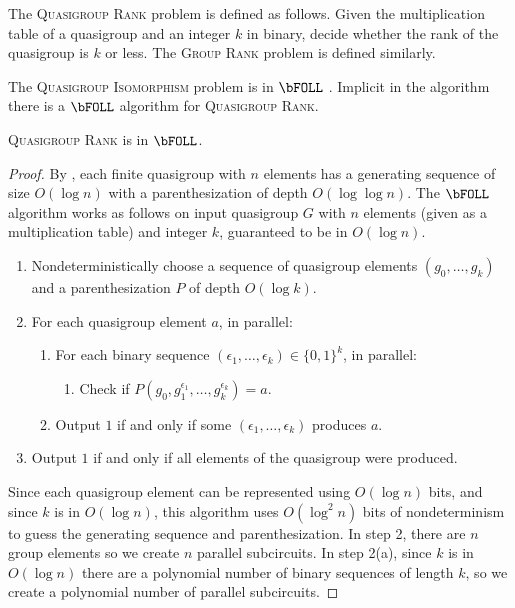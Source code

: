 \documentclass{article}
\begin{document}
The \textsc{Quasigroup Rank} problem is defined as follows.
Given the multiplication table of a quasigroup and an integer $k$ in binary, decide whether the rank of the quasigroup is $k$ or less.
The \textsc{Group Rank} problem is defined similarly.

The \textsc{Quasigroup Isomorphism} problem is in $\bFOLL$ \autocite[Theorem~3.4]{ctw13}.
Implicit in the algorithm there is a $\bFOLL$ algorithm for \textsc{Quasigroup Rank}.

\begin{theorem}
  \textsc{Quasigroup Rank} is in $\bFOLL$.
\end{theorem}
\begin{proof}
  By \autocite[Theorem~3.3]{ctw13}, each finite quasigroup with $n$ elements has a generating sequence of size $O(\log n)$ with a parenthesization of depth $O(\log \log n)$.
  The $\bFOLL$ algorithm works as follows on input quasigroup $G$ with $n$ elements (given as a multiplication table) and integer $k$, guaranteed to be in $O(\log n)$.
  \begin{enumerate}
  \item Nondeterministically choose a sequence of quasigroup elements $(g_0, \dotsc, g_k)$ and a parenthesization $P$ of depth $O(\log k)$.
  \item For each quasigroup element $a$, in parallel:
    \begin{enumerate}
    \item For each binary sequence $(\epsilon_1, \dotsc, \epsilon_k) \in \{0, 1\}^k$, in parallel:
      \begin{enumerate}
      \item Check if $P\left(g_0, g_1^{\epsilon_1}, \dotsc, g_k^{\epsilon_k}\right) = a$.
      \end{enumerate}
    \item Output $1$ if and only if some $(\epsilon_1, \dotsc, \epsilon_k)$ produces $a$.
    \end{enumerate}
  \item Output $1$ if and only if all elements of the quasigroup were produced.
  \end{enumerate}
  Since each quasigroup element can be represented using $O(\log n)$ bits, and since $k$ is in $O(\log n)$, this algorithm uses $O(\log^2 n)$ bits of nondeterminism to guess the generating sequence and parenthesization.
  In step 2, there are $n$ group elements so we create $n$ parallel subcircuits.
  In step 2(a), since $k$ is in $O(\log n)$ there are a polynomial number of binary sequences of length $k$, so we create a polynomial number of parallel subcircuits.

\end{proof}
\end{document}

